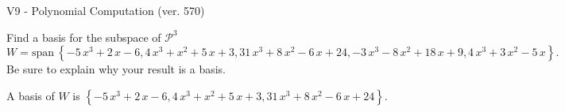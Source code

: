 \begin{exercise}
  \begin{exerciseTitle}V9 - Polynomial Computation (ver. 570)\end{exerciseTitle}
  \begin{exerciseStatement}
    Find a basis for the subspace of \(\mathcal{P}^3\) 
\[W=\mathrm{span}\ \left\{-5 \, x^{3} + 2 \, x - 6 , 4 \, x^{3} + x^{2} + 5 \, x + 3 , 31 \, x^{3} + 8 \, x^{2} - 6 \, x + 24 , -3 \, x^{3} - 8 \, x^{2} + 18 \, x + 9 , 4 \, x^{3} + 3 \, x^{2} - 5 \, x\right\}.\]
 Be sure to explain why your result is a basis.


  \end{exerciseStatement}
  \begin{exerciseAnswer}
   A basis of \(W\) is  \(\left\{-5 \, x^{3} + 2 \, x - 6 , 4 \, x^{3} + x^{2} + 5 \, x + 3 , 31 \, x^{3} + 8 \, x^{2} - 6 \, x + 24\right\}\).
  


  \end{exerciseAnswer}
\end{exercise}